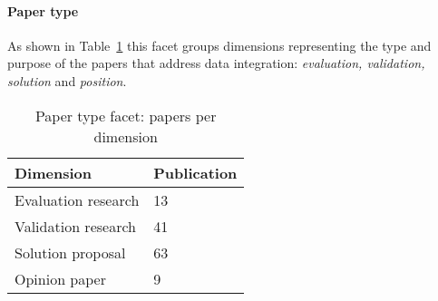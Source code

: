 \paragraph{Paper type}
As shown in   Table~\ref{table:research} this facet groups dimensions representing the type and purpose of the papers that address data integration: {\em evaluation, validation, solution} and {\em  position}.


\begin{table}[h]
\begin{center}
\begin{tabular}{p{4cm}p{4cm}}
\hline 
\textbf{Dimension} & \textbf{Publication} \\ 
\hline 
Evaluation research & 13 \\ 
\hline 
Validation research & 41 \\
\hline 
Solution proposal & 63\\
\hline 
Opinion paper & 9 \\ 
\hline  
\end{tabular}
\end{center}
\caption{Paper type facet: papers per dimension}\label{table:research}
\end{table}

